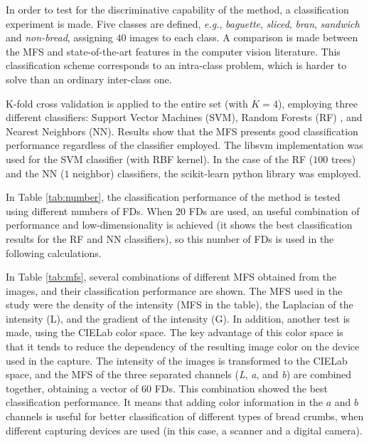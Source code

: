In order to test for the discriminative capability of the method, a classification experiment is made. Five classes are defined, {\em e.g.}, {\em baguette}, {\em sliced}, {\em bran}, {\em sandwich} and {\em non-bread}, assigning $40$ images to each class. A comparison is made between the MFS and state-of-the-art features in the computer vision literature. This classification scheme corresponds to an intra-class problem, which is harder to solve than an ordinary inter-class one. 

K-fold cross validation is applied to the entire set (with $K=4$), employing three different classifiers: Support Vector Machines (SVM), Random Forests (RF) \cite{Breiman2001}, and Nearest Neighbors (NN). Results show that the MFS presents good classification performance regardless of the classifier employed. The \textsf{libsvm} implementation \cite{Chang2011} was used for the SVM classifier (with RBF kernel). In the case of the RF ($100$ trees) and the NN ($1$ neighbor) classifiers, the \textsf{scikit-learn} python library was employed.

In Table \ref{tab:number}, the classification performance of the method is tested using different numbers of FDs. When $20$ FDs are used, an useful combination of performance and low-dimensionality is achieved (it shows the best classification results for the RF and NN classifiers), so this number of FDs is used in the following calculations. 

In Table \ref{tab:mfs}, several combinations of different MFS obtained from the images, and their classification performance are shown. The MFS used in the study were the density of the intensity (MFS in the table), the Laplacian of the intensity (L), and the gradient of the intensity (G). In addition, another test is made, using the CIELab color space. The key advantage of this color space is that it tends to reduce the dependency of the resulting image color on the device used in the capture. The intensity of the images is transformed to the CIELab space, and the MFS of the three separated channels ({\em L}, {\em a}, and {\em b}) are combined together, obtaining a vector of $60$ FDs. This combination showed the best classification performance. It means that adding color information in the $a$ and $b$ channels is useful for better classification of different types of bread crumbs, when different capturing devices are used (in this case, a scanner and a digital camera).

